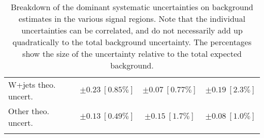 \begin{table}
\begin{center}
\begin{tabular*}{\textwidth}{@{\extracolsep{\fill}}lccc}
W+jets theo. uncert.         & $\pm 0.23\ [0.85\%] $          & $\pm 0.07\ [0.77\%] $          & $\pm 0.19\ [2.3\%] $       \\
Other theo. uncert.         & $\pm 0.13\ [0.49\%] $          & $\pm 0.15\ [1.7\%] $          & $\pm 0.08\ [1.0\%] $       \\
\noalign{\smallskip}\hline\noalign{\smallskip}
\end{tabular*}
\end{center}
\caption[Breakdown of uncertainty on background estimates]{
Breakdown of the dominant systematic uncertainties on background estimates in the various signal regions.
Note that the individual uncertainties can be correlated, and do not necessarily add up quadratically to 
the total background uncertainty. The percentages show the size of the uncertainty relative to the total expected background.
\label{table.results.bkgestimate.uncertainties.SRLMEM_mct2_SRMMEM_mct2_SRHMEM_mct2}}
\end{table}
%